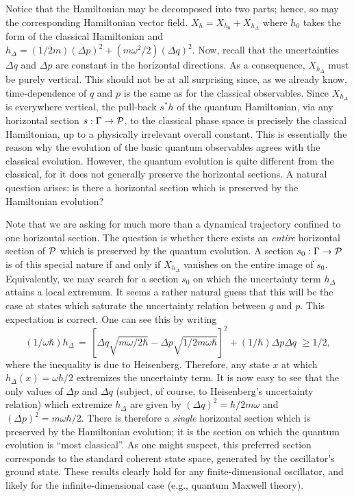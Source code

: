 \documentclass[12pt,aps,eqsecnum,tighten,nofootinbib]{revtex4-2}
\def\be{\begin{equation}}
\def\ee{\end{equation}}
\def\P{{\cal P}}
\def\w{\omega}
\newcommand{\hvf}[1]{{X_{#1}}}
\begin{document}
Notice that the Hamiltonian may be decomposed into two parts; hence,
so may the corresponding Hamiltonian vector field.  $\hvf{h} =
\hvf{h_0} + \hvf{h_\Delta}$ where $h_0$ takes the form of the
classical Hamiltonian and $h_\Delta = (1/2m)(\Delta p)^2 +
(m\w^2/2)(\Delta q)^2$.  Now, recall that the uncertainties $\Delta q$
and $\Delta p$ are constant in the horizontal directions.  As a
consequence, $\hvf{h_\Delta}$ must be purely vertical.  This should
not be at all surprising since, as we already know, time-dependence of
$q$ and $p$ is the same as for the classical observables.  Since
$\hvf{h_\Delta}$ is everywhere vertical, the pull-back $s^* h$ of the
quantum Hamiltonian, via any horizontal section $s : \Gamma
\rightarrow \P$, to the classical phase space is precisely the
classical Hamiltonian, up to a physically irrelevant overall constant.
This is essentially the reason why the evolution of the basic quantum
observables agrees with the classical evolution.  However, the quantum
evolution is quite different from the classical, for it does not
generally preserve the horizontal sections.  A natural question
arises: is there a horizontal section which is preserved by the
Hamiltonian evolution?  

Note that we are asking for much more than a dynamical trajectory
confined to one horizontal section. The question is whether there
exists an {\it entire} horizontal section of $\P$ which is preserved
by the quantum evolution.  A section $s_0 : \Gamma \rightarrow \P$ is
of this special nature if and only if $\hvf{h_\Delta}$ vanishes on the
entire image of $s_0$.  Equivalently, we may search for a section
$s_0$ on which the uncertainty term $h_\Delta$ attains a local
extremum.  It seems a rather natural guess that this will be the case
at states which saturate the uncertainty relation between $q$ and $p$.
This expectation is correct.  One can see this by writing
%
\be 
(1/\w\hbar) h_\Delta \, = \, \left[ \Delta q \sqrt{m\w/2\hbar} -
\Delta p \sqrt{1/2m\w\hbar} \right]^2 + (1/\hbar) \Delta p \Delta q
\,\, \ge 1/2, 
\ee 
%
where the inequality is due to Heisenberg.  Therefore, any state $x$
at which $h_\Delta(x) = \w\hbar/2$ extremizes the uncertainty term.
It is now easy to see that the only values of $\Delta p$ and $\Delta
q$ (subject, of course, to Heisenberg's uncertainty relation) which
extremize $h_\Delta$ are given by $(\Delta q)^2 = \hbar/2m\w$ and
$(\Delta p)^2 = m\w\hbar/2$.  There is therefore a {\it single}
horizontal section which is preserved by the Hamiltonian evolution; it
is the section on which the quantum evolution is ``most classical''.
As one might suspect, this preferred section corresponds to the
standard coherent state space, generated by the oscillator's ground
state.  These results clearly hold for any finite-dimensional
oscillator, and likely for the infinite-dimensional case (e.g.,
quantum Maxwell theory).
\end{document}

